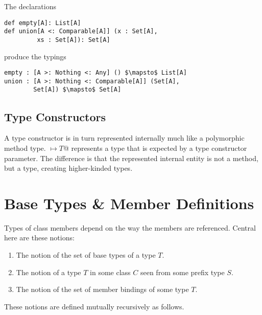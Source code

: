 \example The declarations
\begin{lstlisting}[escapechar=@,deletekeywords={union}]
def empty[A]: List[A]
def union[A <: Comparable[A]] (x : Set[A], 
         xs : Set[A]): Set[A]
\end{lstlisting}
produce the typings
\begin{lstlisting}[escapechar=@,deletekeywords={union}]
empty : [A >: Nothing <: Any] () $\mapsto$ List[A]
union : [A >: Nothing <: Comparable[A]] (Set[A], 
        Set[A]) $\mapsto$ Set[A]
\end{lstlisting}






\subsection{Type Constructors}
\label{sec:type-constructors}

A type constructor is in turn represented internally much like a polymorphic method type. \lstinline@[$\pm a_1$ >: $L_1$ <: $U_1 \commadots \pm a_n$ >: $L_n$ <: $U_n$] $\mapsto T$@ represents a type that is expected by a type constructor parameter. The difference is that the represented internal entity is not a method, but a type, creating higher-kinded types. 






\section{Base Types \& Member Definitions}
\label{sec:base-types}
\label{sec:member-definitions}

Types of class members depend on the way the members are referenced. Central here are these notions:
\begin{enumerate}
\item The notion of the set of base types of a type $T$.
\item The notion of a type $T$ in some class $C$ seen from some prefix type $S$.
\item The notion of the set of member bindings of some type $T$. 
\end{enumerate}

These notions are defined mutually recursively as follows. 

